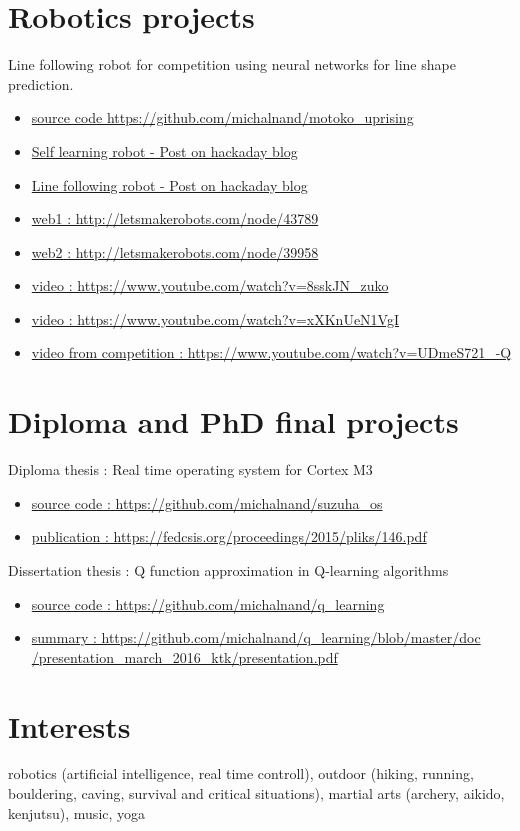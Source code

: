 \documentclass[10pt]{article}
\begin{document}
\section*{Robotics projects}
Line following robot for competition using neural networks for line shape prediction.
\begin{itemize}
\item \href{https://github.com/michalnand/motoko\_uprising}{source code https://github.com/michalnand/motoko\_uprising}
\item \href{https://hackaday.io/project/19924-self-learning-robot}{Self learning robot - Post on hackaday blog}
\item \href{https://hackaday.io/project/163799-motoko-uprising-deep-neural-network-line-following}{Line following robot - Post on hackaday blog}
\item \href{http://letsmakerobots.com/node/43789}{web1 : http://letsmakerobots.com/node/43789}
\item \href{http://letsmakerobots.com/node/39958}{web2 : http://letsmakerobots.com/node/39958}
\item \href{https://www.youtube.com/watch?v=8sskJN\_zuko}{video : https://www.youtube.com/watch?v=8sskJN\_zuko}
\item \href{https://www.youtube.com/watch?v=xXKnUeN1VgI}{video : https://www.youtube.com/watch?v=xXKnUeN1VgI}
\item \href{https://www.youtube.com/watch?v=UDmeS721\_-Q}{video from competition : https://www.youtube.com/watch?v=UDmeS721\_-Q}
\end{itemize}

\section*{Diploma and PhD final projects}
Diploma thesis : Real time operating system for Cortex M3
\begin{itemize}
\item \href{https://github.com/michalnand/suzuha\_os}{source code : https://github.com/michalnand/suzuha\_os}
\item \href{https://fedcsis.org/proceedings/2015/pliks/146.pdf}{publication : https://fedcsis.org/proceedings/2015/pliks/146.pdf}
\end{itemize}
Dissertation thesis : Q function approximation in Q-learning algorithms
\begin{itemize}
\item \href{https://github.com/michalnand/q\_learning}{source code : https://github.com/michalnand/q\_learning}
\item \href{https://github.com/michalnand/q\_learning/blob/master/doc/presentation\_march\_2016\_ktk/presentation.pdf}{summary : https://github.com/michalnand/q\_learning/blob/master/doc\\
                  /presentation\_march\_2016\_ktk/presentation.pdf}
\end{itemize}

\section*{Interests}
robotics (artificial intelligence, real time controll),
outdoor (hiking, running, bouldering, caving, survival and critical situations),
martial arts (archery, aikido, kenjutsu), music, yoga
\end{document}
